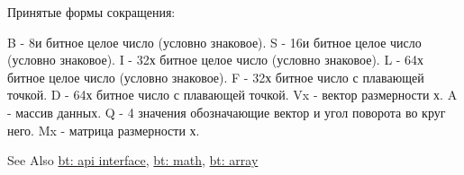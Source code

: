 Принятые формы сокращения\-: \begin{DoxyVerb}  B - 8и битное целое число (условно знаковое).
  S - 16и битное целое число (условно знаковое).
  I - 32х битное целое число (условно знаковое).
  L - 64х битное целое число (условно знаковое).
  F - 32х битное число с плавающей точкой.
  D - 64х битное число с плавающей точкой.
  Vx - вектор размерности х.
  A - массив данных.
  Q - 4 значения обозначающие вектор и угол поворота во круг него.
  Mx - матрица размерности х.
\end{DoxyVerb}


\begin{DoxySeeAlso}{See Also}
\hyperlink{group__apiinterface}{bt\-: api interface}, \hyperlink{group__math}{bt\-: math}, \hyperlink{group__array}{bt\-: array} 
\end{DoxySeeAlso}
